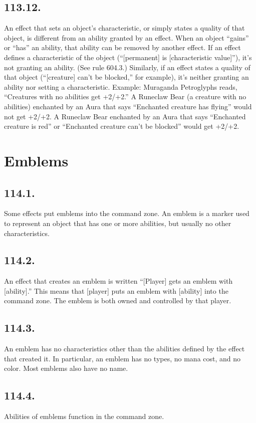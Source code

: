 \subsection*{113.12.}
An effect that sets an object’s characteristic, or simply states a quality of that object, is different from an ability granted by an effect. When an object “gains” or “has” an ability, that ability can be removed by another effect. If an effect defines a characteristic of the object (“[permanent] is [characteristic value]”), it’s not granting an ability. (See rule 604.3.) Similarly, if an effect states a quality of that object (“[creature] can’t be blocked,” for example), it’s neither granting an ability nor setting a characteristic.
Example: Muraganda Petroglyphs reads, “Creatures with no abilities get +2/+2.” A Runeclaw Bear (a creature with no abilities) enchanted by an Aura that says “Enchanted creature has flying” would not get +2/+2. A Runeclaw Bear enchanted by an Aura that says “Enchanted creature is red” or “Enchanted creature can’t be blocked” would get +2/+2.

\section{Emblems}
\subsection*{114.1.}
Some effects put emblems into the command zone. An emblem is a marker used to represent an object that has one or more abilities, but usually no other characteristics.

\subsection*{114.2.}
An effect that creates an emblem is written “[Player] gets an emblem with [ability].” This means that [player] puts an emblem with [ability] into the command zone. The emblem is both owned and controlled by that player.

\subsection*{114.3.}
An emblem has no characteristics other than the abilities defined by the effect that created it. In particular, an emblem has no types, no mana cost, and no color. Most emblems also have no name.

\subsection*{114.4.}
Abilities of emblems function in the command zone.

